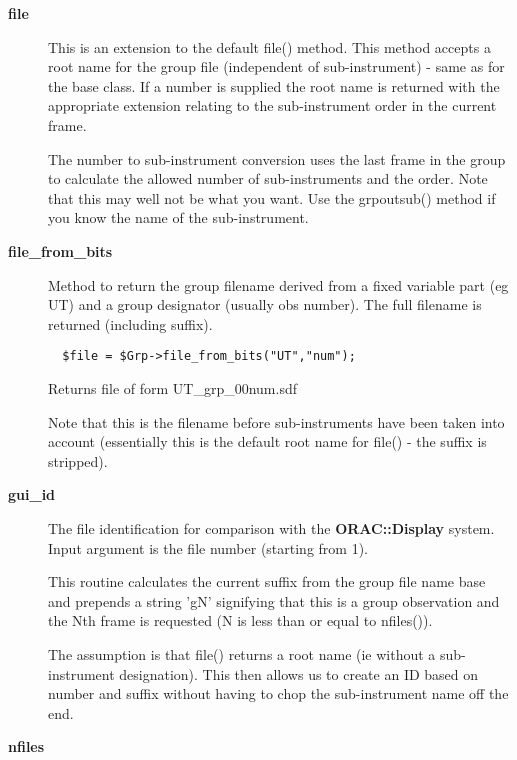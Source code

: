 \begin{description}
\begin{description}
\item[{\textbf{file}}] \mbox{}

This is an extension to the default file() method.
This method accepts a root name for the group file
(independent of sub-instrument) - same as for the base
class. If a number is supplied the root name is returned
with the appropriate extension relating to the
sub-instrument order in the current frame.



The number to sub-instrument conversion uses the last frame in the
group to calculate the allowed number of sub-instruments and
the order. Note that this may well not be what you want.
Use the grpoutsub() method if you know the name of the sub-instrument.


\item[{\textbf{file\_from\_bits}}] \mbox{}

Method to return the group filename derived from a fixed
variable part (eg UT) and a group designator (usually obs
number). The full filename is returned (including suffix).

\begin{verbatim}
  $file = $Grp->file_from_bits("UT","num");
\end{verbatim}


Returns file of form UT\_grp\_00num.sdf



Note that this is the filename before sub-instruments
have been taken into account (essentially this is the
default root name for file() - the suffix is stripped).


\item[{\textbf{gui\_id}}] \mbox{}

The file identification for comparison with the \textbf{ORAC::Display}
system. Input argument is the file number (starting from 1).



This routine calculates the current suffix from the group file
name base and prepends a string 'gN' signifying that this is
a group observation and the Nth frame is requested (N is less than
or equal to nfiles()).



The assumption is that file() returns a root name (ie without
a sub-instrument designation). This then allows us to create an
ID based on number and suffix without having to chop the
sub-instrument name off the end.


\item[{\textbf{nfiles}}] \mbox{}


\end{description}
\end{description}
